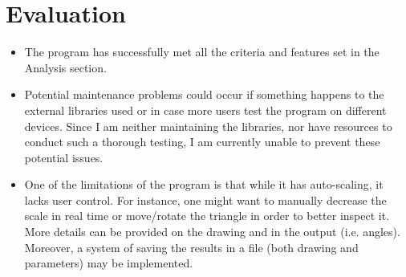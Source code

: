 \documentclass{article}
\begin{document}
\section{Evaluation}
\begin{itemize}
    \item The program has successfully met all the criteria and features set in
        the Analysis section.
    \item Potential maintenance problems could occur if something happens to
        the external libraries used or in case more users test the program on
        different devices. Since I am neither maintaining the libraries, nor
        have resources to conduct such a thorough testing, I am currently
        unable to prevent these potential issues.
    \item One of the limitations of the program is that while it has
        auto-scaling, it lacks user control. For instance, one might want to
        manually decrease the scale in real time or move/rotate the triangle in
        order to better inspect it. More details can be provided on the drawing
        and in the output (i.e. angles).  Moreover, a system of saving the
        results in a file (both drawing and parameters) may be implemented.
\end{itemize}
\end{document}

